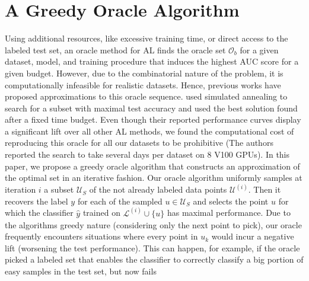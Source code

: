 \documentclass[]{article}
\begin{document}
\section{A Greedy Oracle Algorithm}\label{sec:oracle} 
Using additional resources, like excessive training time, or direct access to the labeled test set, an oracle method for AL finds the oracle set $\mathcal{O}_b$ for a given dataset, model, and
training procedure that induces the highest AUC score for a given budget.
However, due to the combinatorial nature of the problem, it is computationally
infeasible for realistic datasets. Hence, previous works have proposed
approximations to this oracle sequence. \cite{zhou2021towards} used simulated
annealing to search for a subset with maximal test accuracy and used the best solution found
after a fixed time budget. 
Even though their reported performance curves display
a significant lift over all other AL methods, we found the
computational cost of reproducing this oracle for all our datasets to be
prohibitive (The authors reported the search to take several days per dataset on
8 V100 GPUs). In this paper, we propose a greedy oracle algorithm that
constructs an approximation of the optimal set in an iterative fashion. 
Our oracle algorithm
uniformly samples at iteration $i$ a subset $\mathcal{U}_S$ of the not already
labeled data points $\mathcal{U}^{(i)}$.
Then it recovers the label $y$ for each of the sampled $u \in \mathcal{U}_S$ and selects the
point $u$ for which the classifier $\hat{y}$ trained on
$\mathcal{L}^{(i)} \cup \{u\}$ has maximal performance.
Due to the algorithms greedy nature (considering only the next point to pick),
our oracle frequently encounters situations where every point in $u_k$ would
incur a negative lift (worsening the test performance). This can happen, for
example, if the oracle picked a labeled set that enables the classifier to
correctly classify a big portion of easy samples in the test set, but now fails
\end{document}
